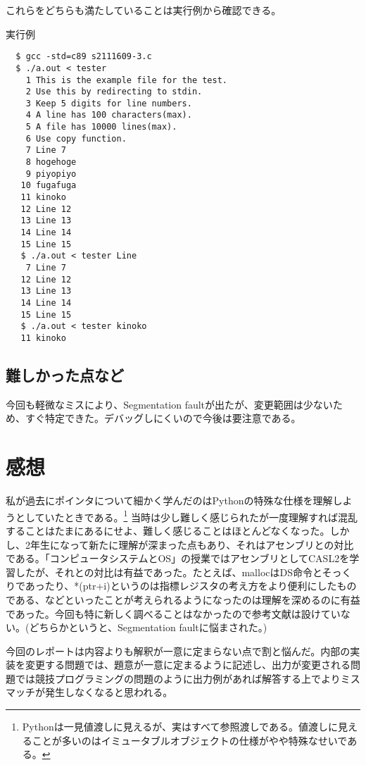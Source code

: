 \documentclass[dvipdfmx,12pt,a4j]{jarticle}
\begin{document}
これらをどちらも満たしていることは実行例から確認できる。
\begin{itembox}[l]{実行例}
\begin{verbatim}
  $ gcc -std=c89 s2111609-3.c
  $ ./a.out < tester
    1 This is the example file for the test.
    2 Use this by redirecting to stdin.
    3 Keep 5 digits for line numbers.
    4 A line has 100 characters(max).
    5 A file has 10000 lines(max).
    6 Use copy function.
    7 Line 7
    8 hogehoge
    9 piyopiyo
   10 fugafuga
   11 kinoko
   12 Line 12
   13 Line 13
   14 Line 14
   15 Line 15
   $ ./a.out < tester Line
    7 Line 7
   12 Line 12
   13 Line 13
   14 Line 14
   15 Line 15
   $ ./a.out < tester kinoko
   11 kinoko
\end{verbatim}
\end{itembox}

\subsection{難しかった点など}
今回も軽微なミスにより、Segmentation faultが出たが、変更範囲は少ないため、すぐ特定できた。デバッグしにくいので今後は要注意である。

\section{感想}
私が過去にポインタについて細かく学んだのはPythonの特殊な仕様を理解しようとしていたときである。\footnote{Pythonは一見値渡しに見えるが、実はすべて参照渡しである。値渡しに見えることが多いのはイミュータブルオブジェクトの仕様がやや特殊なせいである。}
当時は少し難しく感じられたが一度理解すれば混乱することはたまにあるにせよ、難しく感じることはほとんどなくなった。しかし、2年生になって新たに理解が深まった点もあり、それはアセンブリとの対比である。「コンピュータシステムとOS」の授業ではアセンブリとしてCASL2を学習したが、それとの対比は有益であった。たとえば、mallocはDS命令とそっくりであったり、*(ptr+i)というのは指標レジスタの考え方をより便利にしたものである、などといったことが考えられるようになったのは理解を深めるのに有益であった。今回も特に新しく調べることはなかったので参考文献は設けていない。(どちらかというと、Segmentation faultに悩まされた。)

今回のレポートは内容よりも解釈が一意に定まらない点で割と悩んだ。内部の実装を変更する問題では、題意が一意に定まるように記述し、出力が変更される問題では競技プログラミングの問題のように出力例があれば解答する上でよりミスマッチが発生しなくなると思われる。
\end{document}

